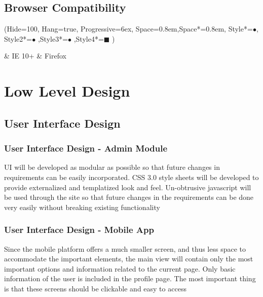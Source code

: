 \documentclass[hidelinks,a4paper]{article}
\begin{document}
		\noindent
	

	
	\subsection{Browser Compatibility}
	\ListProperties(Hide=100, Hang=true, Progressive=6ex, Space=0.8em,Space*=0.8em, Style*=$\bullet$, Style2*=$\bullet$ ,Style3*=$\bullet$ ,Style4*=\tiny$\blacksquare$ )
		
		
		\begin{easylist}
			& \thinspace IE 10+
			& \thinspace Firefox
		\end{easylist}
		
			\newpage
			
		\section{Low Level Design }
		
		\subsection{User Interface Design }
		
		\subsubsectionfont{\color{levelfirst}}
		\subsubsection{User Interface Design - Admin Module }
		

		UI will be developed as modular as possible so that future changes in requirements can be easily incorporated. CSS 3.0 style sheets will be developed to provide externalized and templatized look and feel. Un-obtrusive javascript will be used through the site so that future changes in the requirements can be done very easily without breaking existing functionality
		
		\subsubsection{User Interface Design - Mobile App }
		Since the mobile platform offers a much smaller screen, and thus less space to accommodate the	important elements, the main view will contain only the most important options and information related to the current page.  Only basic information of the user is included in the profile page. The most important thing is that these	screens should be clickable and easy to access \\
		
\end{document}
